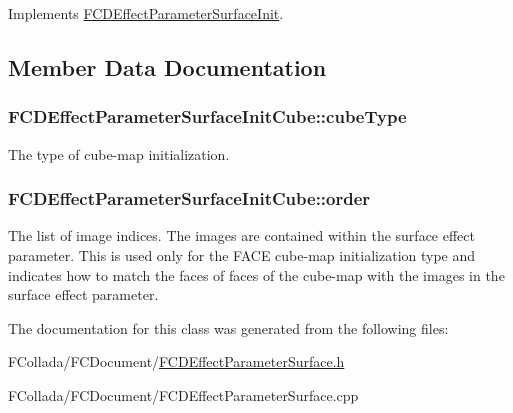Implements \hyperlink{classFCDEffectParameterSurfaceInit_ad0109233e63c892e5963a3ca67f7108f}{FCDEffectParameterSurfaceInit}.



\subsection{Member Data Documentation}
\hypertarget{classFCDEffectParameterSurfaceInitCube_af13376d1509627b73843e631db0abffb}{
\subsubsection[{cubeType}]{ {\bf FCDEffectParameterSurfaceInitCube::cubeType}}}
\label{classFCDEffectParameterSurfaceInitCube_af13376d1509627b73843e631db0abffb}
The type of cube-\/map initialization. \hypertarget{classFCDEffectParameterSurfaceInitCube_abb0a85514c43581c62d9b1167d329035}{
\subsubsection[{order}]{ {\bf FCDEffectParameterSurfaceInitCube::order}}}
\label{classFCDEffectParameterSurfaceInitCube_abb0a85514c43581c62d9b1167d329035}
The list of image indices. The images are contained within the surface effect parameter. This is used only for the FACE cube-\/map initialization type and indicates how to match the faces of faces of the cube-\/map with the images in the surface effect parameter. 

The documentation for this class was generated from the following files:\begin{DoxyCompactItemize}
\item 
FCollada/FCDocument/\hyperlink{FCDEffectParameterSurface_8h}{FCDEffectParameterSurface.h}\item 
FCollada/FCDocument/FCDEffectParameterSurface.cpp\end{DoxyCompactItemize}
